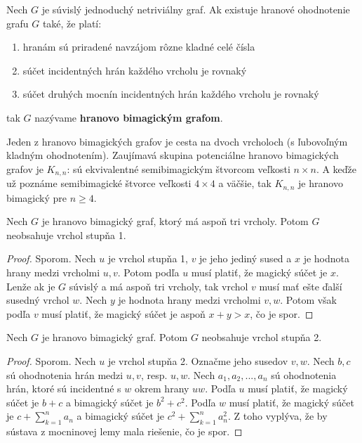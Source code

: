 \begin{subdefinition} Nech $G$ je súvislý jednoduchý netriviálny graf. Ak existuje hranové ohodnotenie grafu $G$ také, že platí:

\begin{enumerate}
\item hranám sú priradené navzájom rôzne kladné celé čísla
\item súčet incidentných hrán každého vrcholu je rovnaký
\item súčet druhých mocnín incidentných hrán každého vrcholu je rovnaký
\end{enumerate}

tak $G$ nazývame \textbf{hranovo bimagickým grafom}.
\end{subdefinition} 

Jeden z hranovo bimagických grafov je cesta na dvoch vrcholoch (s ľubovoľným kladným ohodnotením). Zaujímavá skupina potenciálne hranovo bimagických grafov je $K _{n,n}$: sú ekvivalentné semibimagickým štvorcom veľkosti $n \times n$. A keďže už poznáme semibimagické štvorce veľkosti $4 \times 4$ a väčšie, tak $K _{n,n}$ je hranovo bimagický pre $n \geq 4$.  \\

\begin{subtheorem}
\label{hbgdegree1}
Nech $G$ je hranovo bimagický graf, ktorý má aspoň tri vrcholy. Potom $G$ neobsahuje vrchol stupňa 1.
\end{subtheorem}

\begin{proof} Sporom. Nech $u$ je vrchol stupňa 1, $v$ je jeho jediný sused a $x$ je hodnota hrany medzi vrcholmi $u,v$. Potom podľa $u$ musí platiť, že magický súčet je $x$. Lenže ak je $G$ súvislý a má aspoň tri vrcholy, tak vrchol $v$ musí mať ešte ďalší susedný vrchol $w$. Nech $y$ je hodnota hrany medzi vrcholmi $v,w$. Potom však podľa $v$ musí platiť, že magický súčet je aspoň $x + y > x$, čo je spor.
\end{proof} 

\begin{subtheorem} Nech $G$ je hranovo bimagický graf. Potom $G$ neobsahuje vrchol stupňa 2.
\end{subtheorem}

\begin{proof} Sporom. Nech $u$ je vrchol stupňa 2. Označme jeho susedov $v,w$. Nech $b,c$ sú ohodnotenia hrán medzi $u,v$, resp. $u,w$. Nech $a_1, a_2, ... , a_n$ sú ohodnotenia hrán, ktoré sú incidentné s $w$ okrem hrany $uw$. Podľa $u$ musí platiť, že magický súčet je $b+c$ a bimagický súčet je $b^2 + c^2$. Podľa $w$ musí platiť, že magický súčet je $c + \sum_{k=1}^{n} a_n$ a bimagický súčet je $c^2 + \sum_{k=1}^{n} a^2_n$. Z toho vyplýva, že by sústava z mocninovej lemy mala riešenie, čo je spor.
\end{proof} 

